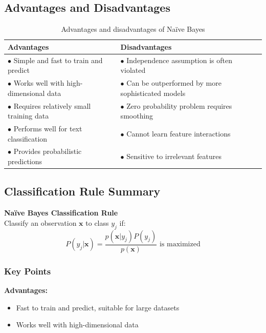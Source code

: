 \documentclass[11pt,a4paper]{article}
\theoremstyle{definition}
\theoremstyle{plain}
\theoremstyle{remark}
\begin{document}
\subsection{Advantages and Disadvantages}

\begin{table}[h]
\centering
\begin{tabular}{|p{7cm}|p{7cm}|}
\hline
\textbf{Advantages} & \textbf{Disadvantages} \\
\hline
$\bullet$ Simple and fast to train and predict & $\bullet$ Independence assumption is often violated \\
$\bullet$ Works well with high-dimensional data & $\bullet$ Can be outperformed by more sophisticated models \\
$\bullet$ Requires relatively small training data & $\bullet$ Zero probability problem requires smoothing \\
$\bullet$ Performs well for text classification & $\bullet$ Cannot learn feature interactions \\
$\bullet$ Provides probabilistic predictions & $\bullet$ Sensitive to irrelevant features \\
\hline
\end{tabular}
\caption{Advantages and disadvantages of Naïve Bayes}
\end{table}

\subsection{Classification Rule Summary}

\begin{center}
\colorbox{blue!15}{\parbox{0.9\textwidth}{
\centering
\textbf{Naïve Bayes Classification Rule}\\[0.3cm]
Classify an observation $\mathbf{x}$ to class $y_j$ if:
\[
P(y_j|\mathbf{x}) = \frac{p(\mathbf{x}|y_j)P(y_j)}{p(\mathbf{x})} \text{ is maximized}
\]
}}
\end{center}

\subsubsection{Key Points}

\textbf{Advantages:}
\begin{itemize}
    \item Fast to train and predict, suitable for large datasets
    \item Works well with high-dimensional data
\end{itemize}
\end{document}
